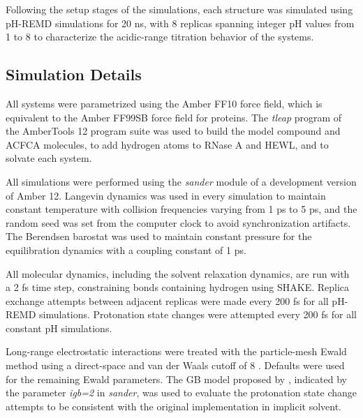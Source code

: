 Following the setup stages of the simulations, each structure was simulated
using pH-REMD simulations for 20 ns, with 8 replicas spanning integer pH values
from 1 to 8 to characterize the acidic-range titration behavior of the systems.

\subsection{Simulation Details}

All systems were parametrized using the Amber FF10 force field, which is
equivalent to the Amber FF99SB force field for proteins.
\cite{Hornak_Proteins_2006_v65_p712} The \emph{tleap} program of the AmberTools
12 program suite was used to build the model compound and ACFCA molecules, to
add hydrogen atoms to RNase A and HEWL, and to solvate each system.

All simulations were performed using the \emph{sander} module of a development
version of Amber 12. \cite{AMBER12} Langevin dynamics was used in every
simulation to maintain constant temperature with collision frequencies varying
from 1 ps to 5 ps, and the random seed was set from
the computer clock to avoid synchronization artifacts.
\cite{Uberuaga_JChemPhys_2004_v120_p6363,
Sindhikara_JChemTheoryComput_2009_v5_p1624} The Berendsen barostat was used to
maintain constant pressure for the equilibration dynamics with a coupling
constant of 1 ps.

All molecular dynamics, including the solvent relaxation dynamics, are run with
a 2 fs time step, constraining bonds containing hydrogen using SHAKE.
\cite{Ryckaert_JComputPhys_1977_v23_p327, Miyamoto_JComputChem_1992_v13_p952}
Replica exchange attempts between adjacent replicas were made every 200 fs for
all pH-REMD simulations. Protonation state changes were attempted every 200 fs
for all constant pH simulations.

Long-range electrostatic interactions were treated with the particle-mesh Ewald
method \cite{Darden_JChemPhys_1993_v98_p10089,
Essmann_JChemPhys_1995_v103_p8577} using a direct-space and van der Waals cutoff
of 8 \text{\AA}. Defaults were used for the remaining Ewald parameters. The GB
model proposed by \citeauthor{Onufriev_Proteins_2004_v55_p383}, indicated by the
parameter \emph{igb=2} in \emph{sander}, \cite{Onufriev_Proteins_2004_v55_p383}
was used to evaluate the protonation state change attempts to be consistent with
the original implementation in implicit solvent.
\cite{Mongan_JComputChem_2004_v25_p2038}

